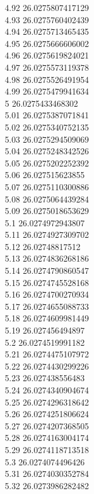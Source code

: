 {4.92	26.0275807417129\\
4.93	26.0275760402439\\
4.94	26.0275713465435\\
4.95	26.0275666606002\\
4.96	26.0275619824021\\
4.97	26.0275573119378\\
4.98	26.0275526491954\\
4.99	26.0275479941634\\
5	26.0275433468302\\
5.01	26.0275387071841\\
5.02	26.0275340752135\\
5.03	26.0275294509069\\
5.04	26.0275248342526\\
5.05	26.0275202252392\\
5.06	26.027515623855\\
5.07	26.0275110300886\\
5.08	26.0275064439284\\
5.09	26.0275018653629\\
5.1	26.0274972943807\\
5.11	26.0274927309702\\
5.12	26.02748817512\\
5.13	26.0274836268186\\
5.14	26.0274790860547\\
5.15	26.0274745528168\\
5.16	26.0274700270934\\
5.17	26.0274655088733\\
5.18	26.0274609981449\\
5.19	26.027456494897\\
5.2	26.0274519991182\\
5.21	26.0274475107972\\
5.22	26.0274430299226\\
5.23	26.027438556483\\
5.24	26.0274340904674\\
5.25	26.0274296318642\\
5.26	26.0274251806624\\
5.27	26.0274207368505\\
5.28	26.0274163004174\\
5.29	26.0274118713518\\
5.3	26.0274074496426\\
5.31	26.0274030352784\\
5.32	26.0273986282482\\
}
